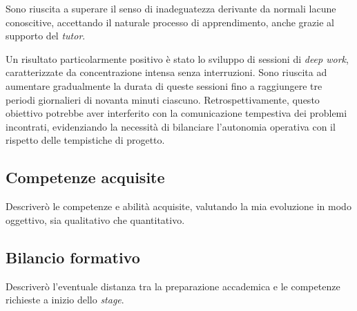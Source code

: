         \vspace{0.2 em}
        \noindent Sono riuscita a superare il senso di inadeguatezza derivante da normali lacune conoscitive, accettando il naturale processo di apprendimento, anche grazie al supporto del \textit{tutor}.

        \vspace{0.2 em}
        \noindent Un risultato particolarmente positivo è stato lo sviluppo di sessioni di \textit{deep work}, caratterizzate da concentrazione intensa senza interruzioni. Sono riuscita ad aumentare gradualmente la durata di queste sessioni fino a raggiungere tre periodi giornalieri di novanta minuti ciascuno. Retrospettivamente, questo obiettivo potrebbe aver interferito con la comunicazione tempestiva dei problemi incontrati, evidenziando la necessità di bilanciare l'autonomia operativa con il rispetto delle tempistiche di progetto.
        
    \subsection{Competenze acquisite}
    Descriverò le competenze e abilità acquisite, valutando la mia evoluzione in modo oggettivo, sia qualitativo che quantitativo. 
    \subsection{Bilancio formativo}
    Descriverò l'eventuale distanza tra la preparazione accademica e le competenze richieste a inizio dello \textit{stage}.